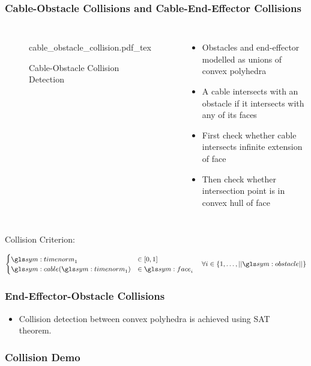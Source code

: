 \begin{frame}
	\frametitle{Cable-Obstacle Collisions and Cable-End-Effector Collisions}

	\begin{columns}
			\begin{figure}[hbt]
				\centering
				\def\svgwidth{\columnwidth}
				{cable_obstacle_collision.pdf_tex}
				\caption{Cable-Obstacle Collision Detection}%
				\label{fig:cable_obstacle_collision_detection}
			\end{figure}
			\begin{itemize}
				\item
					Obstacles and end-effector modelled as unions of convex
					polyhedra
				\item
					A cable intersects with an obstacle if it intersects with
					any of its faces
				\item
					First check whether cable intersects infinite extension of
					face
				\item
					Then check whether intersection point is in convex hull of
					face
			\end{itemize}
	\end{columns}

	Collision Criterion:

	\begin{equation*}
		\begin{cases}
			\timenorm_1 &\in [0, 1]\\
			\cable(\timenorm_1) &\in \face_i
		\end{cases}
		\quad \forall i \in \{1, \ldots, \norm{\obstacle}\}
		\label{eq:cable_obstacle_collision_condition}
	\end{equation*}

\end{frame}

\begin{frame}
	\frametitle{End-Effector-Obstacle Collisions}

	\begin{itemize}
		\item

			Collision detection between convex polyhedra is achieved using SAT
			theorem.~\cite{bib:planning:hierarchical_structure_for_rapid_interference_detection}

	\end{itemize}
\end{frame}

\begin{frame}
	\frametitle{Collision Demo}

\end{frame}
